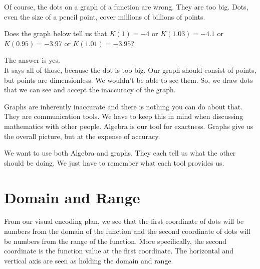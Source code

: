 \documentclass{ximera}
\begin{document}
Of course, the dots on a graph of a function are wrong. They are too big. Dots, even the size of a pencil point, cover millions of billions of points.

Does the graph below tell us that $K(1) = -4$ or $K(1.03) = -4.1$ or $K(0.95) = -3.97$ or $K(1.01) = -3.95$?

\begin{image}
\end{image}

The answer is yes.  \\


It says all of those, because the dot is too big.  Our graph should consist of points, but points are dimensionless.  We wouldn't be able to see them.  So, we draw dots that we can see and accept the inaccuracy of the graph.

Graphs are inherently inaccurate and there is nothing you can do about that.  They are communication tools. We have to keep this in mind when discussing mathematics with other people. Algebra is our tool for exactness.  Graphs give us the overall picture, but at the expense of accuracy.

We want to use both Algebra and graphs.  They each tell us what the other should be doing.  We just have to remember what each tool provides us.










\section{Domain and Range}


From our visual encoding plan, we see that the first coordinate of dots will be numbers from the domain of the function and the second coordinate of dots will be numbers from the range of the function.  More specifically, the second coordinate is the function value at the first coordinate.  The horizontal and vertical axis are seen as holding the domain and range.
\end{document}
